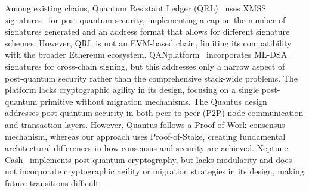 Among existing chains, Quantum Resistant Ledger (QRL)~\cite{QRL:WP18} uses XMSS signatures~\cite{PQCRYPTO:BucDahHul11} for post-quantum security, implementing a cap on the number of signatures generated and an address format that allows for different signature schemes. 
However, QRL is not an EVM-based chain, limiting its compatibility with the broader Ethereum ecosystem. 
QANplatform~\cite{qanplatform2026} incorporates ML-DSA~\cite{NIST:24MLDSA} signatures for cross-chain signing, but this addresses only a narrow aspect of post-quantum security rather than the comprehensive stack-wide problems. 
The platform lacks cryptographic agility in its design, focusing on a single post-quantum primitive without migration mechanisms. 
The Quantus design~\cite{QUANTUS:031} addresses post-quantum security in both peer-to-peer (P2P) node communication and transaction layers. 
However, Quantus follows a Proof-of-Work consensus mechanism, whereas our approach uses Proof-of-Stake, creating fundamental architectural differences in how consensus and security are achieved. 
Neptune Cash~\cite{NEPTUNE:SV25} implements post-quantum cryptography, but lacks modularity and does not incorporate cryptographic agility or migration strategies in its design, making future transitions difficult.




